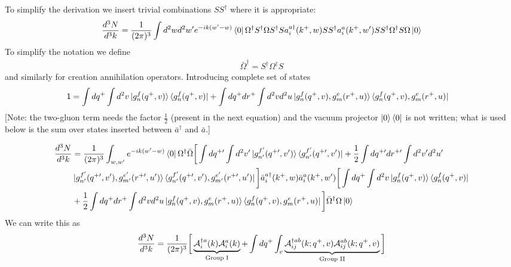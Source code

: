 \documentclass[aps,prd,amsmath,amssymb,nofootinbib]{revtex4-2}
\numberwithin{equation}{section}
\begin{document}
To simplify the derivation we insert trivial combinations $S S^\dagger$ where it is appropriate: 
\begin{equation}
\frac{d^3  N}{d^3 k} = \frac{1}{(2\pi)^{3}}\int  d^{2}w d^{2} w^\prime 
e^{-ik (w^{\prime}-w)}
\bra{0}\Omega^{\dagger} S^{\dagger}\Omega  S^\dagger  S a^{a\dagger}_{i}(k^{+},w) 
 S S^\dagger a^{a}_{i} (k^{+} , w^\prime)  S S^\dagger  \Omega^{\dagger} S\Omega\ket{0}
\end{equation}
To simplify the notation we define 
\begin{align}
   \bar \Omega^\dagger =  S^\dagger \Omega^\dagger S  
\end{align}
and similarly for creation annihilation operators. Introducing complete set of states
\begin{align}
    \mathsf{1} & = \int dq^{+} \int d^{2}v \ket{g^{f}_{n}(q^{+},v)}\bra{g^{f}_{n}(q^{+},v)} + \int dq^{+} dr^{+} \int d^{2}v d^{2}u \ket{g^{f}_{n}(q^{+},v),g^{e}_{m}(r^{+},u)}\bra{g^{f}_{n}(q^{+},v),g^{e}_{m}(r^{+},u)}
\end{align} {\color{red}[Note: the two-gluon term needs the factor $\frac12$ (present in the next equation) and the vacuum projector $\ket{0}\bra{0}$ is not written; what is used below is the sum over states inserted between $\bar a^{\dagger}$ and $\bar a$.]}\par\noindent 
\begin{align}
\frac{d^3  N}{d^3 k} &  = \frac{1}{(2\pi)^{3}}\int_{w,w^\prime} e^{-i k (w^{\prime}-w)}\bra{0}\Omega^{\dagger}\bar{\Omega} \bigg[ \int dq^{+\prime} \int d^{2}v^{\prime} \ket{g^{f^{\prime}}_{n^{\prime}}(q^{+\prime},v^{\prime})}\bra{g^{f^{\prime}}_{n^{\prime}}(q^{+\prime},v^{\prime})}  + \frac{1}{2}\int dq^{+\prime} dr^{+\prime} \int d^{2}v^{\prime} d^{2}u^{\prime} \notag \\ &\ket{g^{f^{\prime}}_{n^{\prime}}(q^{+\prime},v^{\prime}),g^{e^{\prime}}_{m^{\prime}}(r^{+\prime},u^{\prime})}\bra{g^{f^{\prime}}_{n^{\prime}}(q^{+\prime},v^{\prime}),g^{e^{\prime}}_{m^{\prime}}(r^{+\prime},u^{\prime})}\bigg]\bar a^{a\dagger }_{i} (k^{+} , w)\bar a^{a}_{i} (k^{+} , w^\prime)\bigg[ \int dq^{+} \int d^{2}v \ket{g^{f}_{n}(q^{+},v)}\bra{g^{f}_{n}(q^{+},v)} \notag \\ & + \frac{1}{2}\int dq^{+} dr^{+} \int d^{2}v d^{2}u \ket{g^{f}_{n}(q^{+},v),g^{e}_{m}(r^{+},u)}\bra{g^{f}_{n}(q^{+},v),g^{e}_{m}(r^{+},u)} \bigg]\bar \Omega^{\dagger} \Omega\ket{0}
\end{align}
We can write this as
\begin{equation}
    \frac{d^3  N}{d^3 k}   = \frac{1}{(2\pi)^{3}}\bigg[\underbrace{{\cal A}^{\dagger a}_{i}(k){\cal A}^{a}_{i}(k)}_{\text{Group I}} + 
    \int dq^+ \int_v
    \underbrace{{\cal A}^{\dagger ab}_{ij}(k; q^+, v){\cal A}^{ab}_{ij}(k; q^+, v)}_{\text{Group II}}\bigg]
\end{equation}
\end{document}
